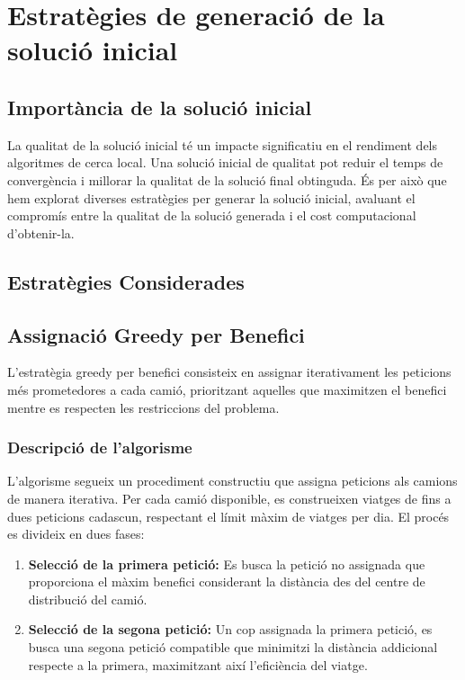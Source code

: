 \section{Estratègies de generació de la solució inicial}
\label{sec:initial}

\subsection{Importància de la solució inicial}

La qualitat de la solució inicial té un impacte significatiu en el rendiment dels algoritmes de cerca local. Una solució inicial de qualitat pot reduir el temps de convergència i millorar la qualitat de la solució final obtinguda. És per això que hem explorat diverses estratègies per generar la solució inicial, avaluant el compromís entre la qualitat de la solució generada i el cost computacional d'obtenir-la.

\subsection{Estratègies Considerades}

\subsection{Assignació Greedy per Benefici}

L'estratègia greedy per benefici consisteix en assignar iterativament les peticions més prometedores a cada camió, prioritzant aquelles que maximitzen el benefici mentre es respecten les restriccions del problema.

\subsubsection{Descripció de l'algorisme}

L'algorisme segueix un procediment constructiu que assigna peticions als camions de manera iterativa. Per cada camió disponible, es construeixen viatges de fins a dues peticions cadascun, respectant el límit màxim de viatges per dia. El procés es divideix en dues fases:

\begin{enumerate}
    \item \textbf{Selecció de la primera petició:} Es busca la petició no assignada que proporciona el màxim benefici considerant la distància des del centre de distribució del camió.
    
    \item \textbf{Selecció de la segona petició:} Un cop assignada la primera petició, es busca una segona petició compatible que minimitzi la distància addicional respecte a la primera, maximitzant així l'eficiència del viatge.
\end{enumerate}

